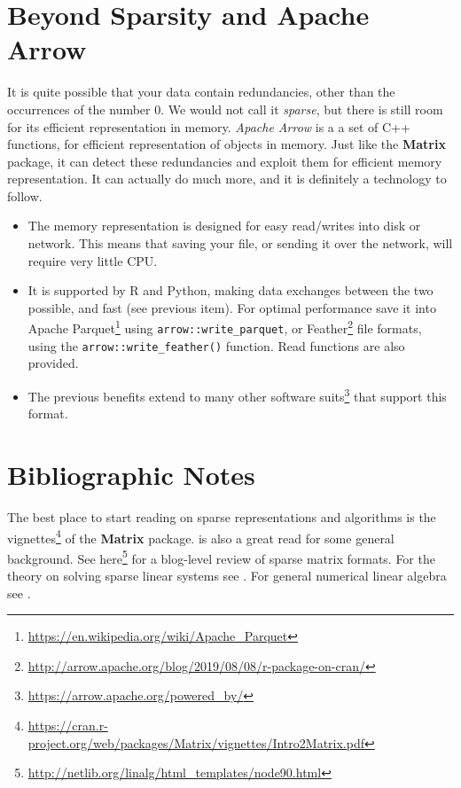 \documentclass[]{book}
\providecommand{\tightlist}{%
  \setlength{\itemsep}{0pt}\setlength{\parskip}{0pt}}
\renewcommand{\href}[2]{#2\footnote{\url{#1}}}
\theoremstyle{definition}
\theoremstyle{definition}
\theoremstyle{definition}
\theoremstyle{remark}
\begin{document}
\hypertarget{beyond-sparsity-and-apache-arrow}{%
\section{Beyond Sparsity and Apache Arrow}\label{beyond-sparsity-and-apache-arrow}}

It is quite possible that your data contain redundancies, other than the occurrences of the number 0.
We would not call it \emph{sparse}, but there is still room for its efficient representation in memory.
\emph{Apache Arrow} is a a set of C++ functions, for efficient representation of objects in memory.
Just like the \textbf{Matrix} package, it can detect these redundancies and exploit them for efficient memory representation.
It can actually do much more, and it is definitely a technology to follow.

\begin{itemize}
\tightlist
\item
  The memory representation is designed for easy read/writes into disk or network. This means that saving your file, or sending it over the network, will require very little CPU.
\item
  It is supported by R and Python, making data exchanges between the two possible, and fast (see previous item). For optimal performance save it into \href{https://en.wikipedia.org/wiki/Apache_Parquet}{Apache Parquet} using \texttt{arrow::write\_parquet}, or \href{http://arrow.apache.org/blog/2019/08/08/r-package-on-cran/}{Feather} file formats, using the \texttt{arrow::write\_feather()} function. Read functions are also provided.
\item
  The previous benefits extend to many other \href{https://arrow.apache.org/powered_by/}{software suits} that support this format.
\end{itemize}

\hypertarget{bibliographic-notes-12}{%
\section{Bibliographic Notes}\label{bibliographic-notes-12}}

The best place to start reading on sparse representations and algorithms is the \href{https://cran.r-project.org/web/packages/Matrix/vignettes/Intro2Matrix.pdf}{vignettes} of the \textbf{Matrix} package.
\citet{gilbert1992sparse} is also a great read for some general background.
See \href{http://netlib.org/linalg/html_templates/node90.html}{here} for a blog-level review of sparse matrix formats.
For the theory on solving sparse linear systems see \citet{davis2006direct}.
For general numerical linear algebra see \citet{gentle2012numerical}.
\end{document}
